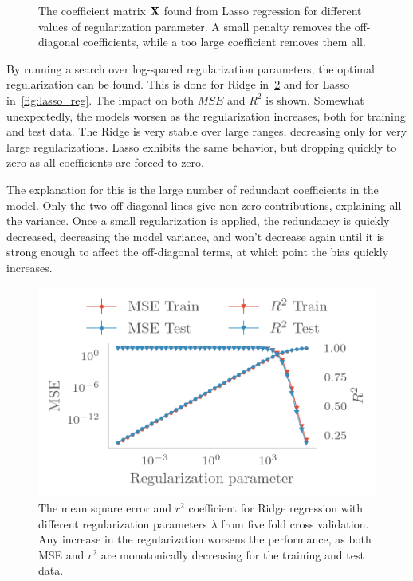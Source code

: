 \begin{figure}[H]
  \caption{\label{fig:lasso_coeff} The coefficient matrix \(\vb{X}\) found from
    Lasso regression for different values of regularization parameter. A small
    penalty removes the off-diagonal coefficients, while a too large coefficient
   removes them all.}
\end{figure}

By running a search over log-spaced regularization parameters, the optimal
regularization can be found. This is done for Ridge in~\cref{fig:ridge_reg} and
for Lasso in~\cref{fig:lasso_reg}. The impact on both \(MSE\) and \(R^{2}\) is
shown. Somewhat unexpectedly, the models worsen as the regularization
increases, both for training and test data. The Ridge is very stable over large
ranges, decreasing only for very large regularizations. Lasso
exhibits the same behavior, but dropping quickly to zero as all coefficients are
forced to zero.

The explanation for this is the large number of redundant coefficients in the
model. Only the two off-diagonal lines give non-zero contributions, explaining
all the variance. Once a small regularization is applied, the redundancy is
quickly decreased, decreasing the model variance, and won't decrease again until it is strong enough to affect
the off-diagonal terms, at which point the bias quickly increases.

\begin{figure}[H]
  \centering
  \includegraphics[]{figures/ridge_reg.png}
  \caption{\label{fig:ridge_reg} The mean square error and \(r^{2}\) coefficient
    for Ridge regression with different regularization parameters \(\lambda\)
    from five fold cross validation.
    Any increase in the regularization worsens the performance, as both MSE and
    \(r^{2}\) are monotonically decreasing for the training and test data.}
\end{figure}


